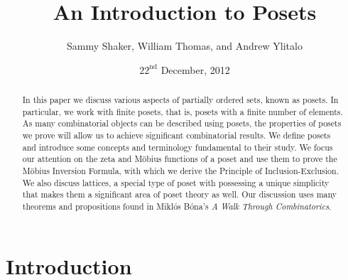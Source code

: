 \documentclass{article} %
\theoremstyle{definition}
\theoremstyle{plain}
\begin{document}
\begin{titlepage}
\title{\huge An Introduction to Posets} 
\author{Sammy Shaker, William Thomas, and Andrew Ylitalo}
\date{$\mathrm{22^{nd}}$ December, 2012}
\maketitle
\end{titlepage}

\begin{titlepage}

\begin{abstract}
In this paper we discuss various aspects of partially ordered sets, known as posets. In particular, we work with finite posets, that is, posets with a finite number of elements. As many combinatorial objects can be described using posets, the properties of posets we prove will allow us to achieve significant combinatorial results. We define posets and introduce some concepts and terminology fundamental to their study. We focus our attention on the zeta and M\"{o}bius functions of a poset and use them to prove the M\"{o}bius Inversion Formula, with which we derive the Principle of Inclusion-Exclusion. We also discuss lattices, a special type of poset with possessing a unique simplicity that makes them a significant area of poset theory as well. Our discussion uses many theorems and propositions found in Mikl\'{o}s B\'{o}na's \textit{A Walk Through Combinatorics}. 
\end{abstract}
\end{titlepage}

\section{Introduction}
\end{document}

